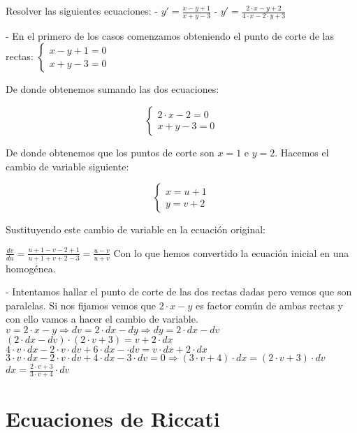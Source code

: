 \begin{ejer}
	Resolver las siguientes ecuaciones:  
	- $y' = \frac{x-y+1}{x+y-3}$   
	- $y' = \frac{2\cdot x-y+2}{4\cdot x - 2\cdot y + 3}$  
\end{ejer}
\begin{sol}
	- En el primero de los casos comenzamos obteniendo el punto de corte de las rectas:  
	$\begin{cases}
	x-y+1 = 0 \\
	x+y-3 = 0
	\end{cases}$
	
	De donde obtenemos sumando las dos ecuaciones:  
	
	$$
	\begin{cases}
	2\cdot x-2 = 0 \\
	x+y-3 = 0
	\end{cases}
	$$  
	
	De donde obtenemos que los puntos de corte son $x=1$ e $y=2$.  
	Hacemos el cambio de variable siguiente:  
	
	$$
	\begin{cases}
	x=u+1\\
	y = v+2
	\end{cases}
	$$ 
	
	Sustituyendo este cambio de variable en la ecuación original:  
	
	$\frac{dv}{du} =  \frac{u+1-v-2+1}{u+1+v+2-3} = \frac{u-v}{u+v}$  
	Con lo que hemos convertido la ecuación inicial en una homogénea.  
	
	- Intentamos hallar el punto de corte de las dos rectas dadas pero vemos que son paralelas. Si nos fijamos vemos que $2\cdot x -y$ es factor común de ambas rectas y con ello vamos a hacer el cambio de variable.  
	$v = 2\cdot x - y \Rightarrow dv = 2\cdot dx - dy \Rightarrow dy = 2\cdot dx - dv$  
	$(2\cdot dx - dv)\cdot (2\cdot v + 3) = v+2\cdot dx$  
	$4\cdot v\cdot dx - 2\cdot v\cdot dv + 6\cdot dx - \cdot dv = v\cdot dx + 2\cdot dx$  
	$3\cdot v\cdot dx - 2\cdot v \cdot dv + 4\cdot dx -3\cdot dv = 0 \Rightarrow (3\cdot v + 4)\cdot dx = (2\cdot v + 3)\cdot dv$  
	$dx = \frac{2\cdot v + 3}{3\cdot v + 4}\cdot dv$  
\end{sol}


\section{Ecuaciones de Riccati}

